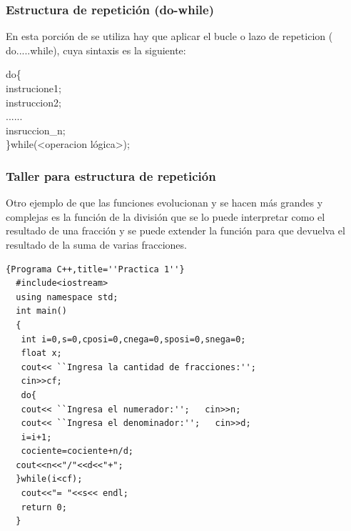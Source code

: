 \documentclass[a4paper,12pt,spanish]{article}
\begin{document}
\newpage
\restoregeometry

\subsubsection{Estructura de repetición (do-while)
}


En esta porción de se utiliza hay que aplicar el  bucle o lazo de repeticion ( do{.....}while), cuya sintaxis es la siguiente:

    \begin{tcolorbox}[title=''Sintaxis de un do{...}while(..);'']
      do\{\\
        instrucione1;\\
        instruccion2;\\
        ......\\
        insruccion\_n;\\
       \}while(<operacion lógica>);
    \end{tcolorbox}

\subsubsection{Taller para estructura de repetición}

     Otro ejemplo de que las funciones evolucionan y se hacen más grandes y complejas es la función de la división que se lo puede interpretar como el resultado de una fracción y se puede extender la función para que devuelva el resultado de la suma de varias fracciones.

    \begin{lstlisting}[frame=trBL,caption={\textbf{sumafracciones()}}]{Programa C++,title=''Practica 1''}
  #include<iostream>
  using namespace std;
  int main()
  {
   int i=0,s=0,cposi=0,cnega=0,sposi=0,snega=0;
   float x;
   cout<< ``Ingresa la cantidad de fracciones:'';
   cin>>cf;
   do{
   cout<< ``Ingresa el numerador:'';   cin>>n;
   cout<< ``Ingresa el denominador:'';   cin>>d;
   i=i+1;
   cociente=cociente+n/d;
  cout<<n<<"/"<<d<<"+";
  }while(i<cf);
   cout<<"= "<<s<< endl;
   return 0;
  }
\end{lstlisting}
\end{document}
